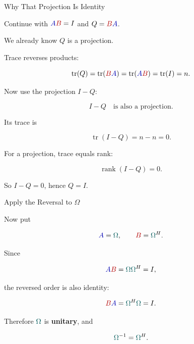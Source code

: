 \documentclass[10pt]{beamer}
\theoremstyle{definition}
\newcommand{\x}[1]{\alert{\textbf{#1}}}
\newcommand{\rd}[1]{{\color{red!70!black}#1}}
\newcommand{\bl}[1]{{\color{blue!70!black}#1}}
\newcommand{\tl}[1]{{\color{teal!70!black}#1}}
\begin{document}
\begin{frame}[shrink=6]{Why That Projection Is Identity}

Continue with $\bl{A}\rd{B}=I$ and $Q=\rd{B}\bl{A}$.

\vfill

We already know $Q$ is a projection.

\vfill\pause

Trace reverses products:

$$
\operatorname{tr}(Q)
=\operatorname{tr}(\rd{B}\bl{A})
=\operatorname{tr}(\bl{A}\rd{B})
=\operatorname{tr}(I)
=n.
$$

\vfill\pause

Now use the projection $I-Q$:

$$
I-Q \quad\text{is also a projection.}
$$

\vfill

Its trace is

$$
\operatorname{tr}(I-Q)=n-n=0.
$$

\vfill

For a projection, trace equals rank:

$$
\operatorname{rank}(I-Q)=0.
$$

\vfill

So $I-Q=0$, hence $Q=I$.

\end{frame}


\begin{frame}[shrink=6]{Apply the Reversal to $\Omega$}

Now put

$$
\bl{A}=\tl{\Omega},
\qquad
\rd{B}=\tl{\Omega}^H.
$$

\vfill

Since

$$
\bl{A}\rd{B}
=\tl{\Omega}\tl{\Omega}^H
=I,
$$

\vfill\pause

the reversed order is also identity:

$$
\rd{B}\bl{A}
=\tl{\Omega}^H\tl{\Omega}
=I.
$$

\vfill

Therefore $\tl{\Omega}$ is \x{unitary}, and

$$
\tl{\Omega}^{-1}=\tl{\Omega}^H.
$$

\end{frame}
\end{document}
